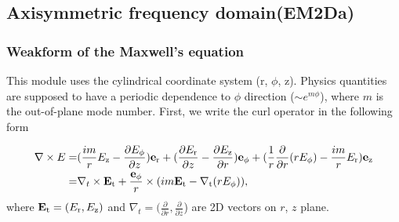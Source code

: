 \documentclass[11pt,a4paper,final]{report}
\begin{document}
\subsection{Axisymmetric frequency domain(EM2Da)}
\subsubsection{Weakform of the Maxwell's equation}
This module uses the cylindrical coordinate system (r,  $\phi$, z). Physics quantities are supposed to have a periodic dependence to 
$\phi$ direction ($\sim e^{m \phi}$), where $m$ is the out-of-plane mode number. First, we write the curl operator in the following form

 \begin{align}
 \nabla \times E = &(\frac{im}{r} E_{\rm z} - \frac{\partial E_{\phi}}{\partial z})\mathbf{e}_{\rm r} +
( \frac{\partial E_{\rm r}}{\partial z} - \frac{\partial E_{\rm z}}{\partial r})\mathbf{e}_{\rm \phi}+
 (\frac{1}{r}\frac{\partial }{\partial r}(r E_{\phi}) - \frac{im}{r} E_{\rm r} )\mathbf{e}_{\rm z} 
 \notag \\ 
 = &\nabla_{t} \times \mathbf{E}_{\rm t} + \frac{\mathbf{e}_{\rm \phi}}{r} \times (im \mathbf{E}_{\rm t} - \nabla_{\rm t} (rE_{\rm \phi}) ),
 \end{align}
 where $\mathbf{E}_{\rm t} = (E_{\rm r}, E_{\rm z})$ and  $\nabla_{t} = (\frac{\partial }{\partial r}, \frac{\partial }{\partial z}$) are 2D vectors on $r$, $z$ plane.
 
\end{document}
